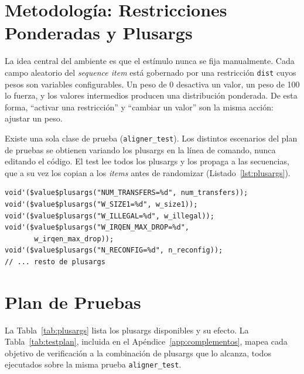 \documentclass[conference]{IEEEtran}
\begin{document}
\section{Metodología: Restricciones Ponderadas y Plusargs}
\label{sec:metodologia}

La idea central del ambiente es que el estímulo nunca se fija manualmente. Cada
campo aleatorio del \textit{sequence item} está gobernado por una restricción
\texttt{dist} cuyos pesos son variables configurables. Un peso de 0 desactiva un
valor, un peso de 100 lo fuerza, y los valores intermedios producen una
distribución ponderada. De esta forma, ``activar una restricción'' y ``cambiar
un valor'' son la misma acción: ajustar un peso.

Existe una sola clase de prueba (\texttt{aligner\_test}). Los distintos
escenarios del plan de pruebas se obtienen variando los plusargs en la línea de
comando, nunca editando el código. El test lee todos los plusargs y los propaga a
las secuencias, que a su vez los copian a los \textit{items} antes de
randomizar (Listado~\ref{lst:plusargs}).

\begin{lstlisting}[caption={Lectura de plusargs en el test general},label={lst:plusargs}]
void'($value$plusargs("NUM_TRANSFERS=%d", num_transfers));
void'($value$plusargs("W_SIZE1=%d", w_size1));
void'($value$plusargs("W_ILLEGAL=%d", w_illegal));
void'($value$plusargs("W_IRQEN_MAX_DROP=%d",
       w_irqen_max_drop));
void'($value$plusargs("N_RECONFIG=%d", n_reconfig));
// ... resto de plusargs
\end{lstlisting}

\section{Plan de Pruebas}
\label{sec:testplan}

La Tabla~\ref{tab:plusargs} lista los plusargs disponibles y su efecto. La
Tabla~\ref{tab:testplan}, incluida en el Apéndice~\ref{app:complementos}, mapea
cada objetivo de verificación a la combinación de plusargs que lo alcanza, todos
ejecutados sobre la misma prueba \texttt{aligner\_test}.
\end{document}
